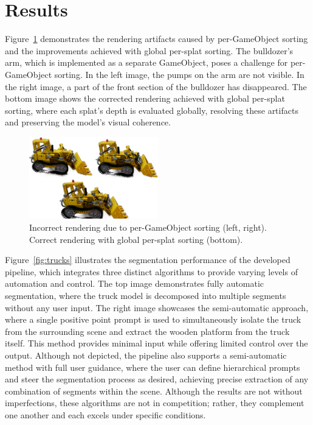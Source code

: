 \documentclass[twocolumn]{article}
\begin{document}
	\section{Results}
	Figure~\ref{fig:render} demonstrates the rendering artifacts caused by per-GameObject sorting and the improvements achieved with global per-splat sorting. The bulldozer’s arm, which is implemented as a separate GameObject, poses a challenge for per-GameObject sorting. In the left image, the pumps on the arm are not visible. In the right image, a part of the front section of the bulldozer has disappeared. The bottom image shows the corrected rendering achieved with global per-splat sorting, where each splat’s depth is evaluated globally, resolving these artifacts and preserving the model's visual coherence.
	\begin{figure}[h!]
		\centering
		\includegraphics[width=0.5\textwidth]{Images/Untitled.png}
		\caption{Incorrect rendering due to per-GameObject sorting (left, right). Correct rendering with global per-splat sorting (bottom).}
		\label{fig:render}
	\end{figure}
	\FloatBarrier
	\noindent
	Figure~\ref{fig:trucks} illustrates the segmentation performance of the developed pipeline, which integrates three distinct algorithms to provide varying levels of automation and control. The top image demonstrates fully automatic segmentation, where the truck model is decomposed into multiple segments without any user input. The right image showcases the semi-automatic approach, where a single positive point prompt is used to simultaneously isolate the truck from the surrounding scene and extract the wooden platform from the truck itself. This method provides minimal input while offering limited control over the output. Although not depicted, the pipeline also supports a semi-automatic method with full user guidance, where the user can define hierarchical prompts and steer the segmentation process as desired, achieving precise extraction of any combination of segments within the scene. Although the results are not without imperfections, these algorithms are not in competition; rather, they complement one another and each excels under specific conditions.
\end{document}
